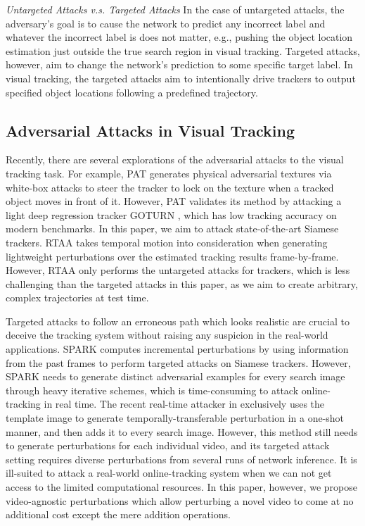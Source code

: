 \documentclass[journal]{IEEEtran}
\newcommand{\eg}{e.g.}
\begin{document}
\textit{Untargeted Attacks v.s. Targeted Attacks} In the case of untargeted attacks, the adversary's goal is to cause the network to predict any incorrect label and whatever the incorrect label is does not matter, \eg, pushing the object location estimation just outside the true search region in visual tracking.
Targeted attacks, however, aim to change the network's prediction to some specific target label. In visual tracking, the targeted attacks aim to intentionally drive trackers to output specified object locations following a predefined trajectory.

\subsection{Adversarial Attacks in Visual Tracking}

Recently, there are several explorations of the adversarial attacks to the visual tracking task. For example, PAT \cite{PAT} generates physical adversarial textures via white-box attacks to steer the tracker to lock on the texture when a tracked object moves in front of it. However, PAT validates its method by attacking a light deep regression tracker GOTURN \cite{GOTURN}, which has low tracking accuracy on modern benchmarks. In this paper, we aim to attack state-of-the-art Siamese trackers.
RTAA \cite{RTAA} takes temporal motion into consideration when generating lightweight perturbations over the estimated tracking results frame-by-frame. However, RTAA only performs the untargeted attacks for trackers, which is less challenging than the targeted attacks in this paper, as we aim to create arbitrary, complex trajectories at test time. 

Targeted attacks to follow an erroneous path which looks realistic are crucial to deceive the tracking system without raising any suspicion in the real-world applications.
SPARK \cite{SPARK} computes incremental perturbations by using information from the past frames to perform targeted attacks on Siamese trackers. 
However, SPARK needs to generate distinct adversarial examples for every search image through heavy iterative schemes, which is time-consuming to attack online-tracking in real time. The recent real-time attacker in \cite{TTP} exclusively uses the template image to generate temporally-transferable perturbation in a one-shot manner, and then adds it to every search image. However, this method still needs to generate perturbations for each individual video, and its targeted attack setting requires diverse perturbations from several runs of network inference. It is ill-suited to attack a real-world online-tracking system when we can not get access to the limited computational resources. In this paper, however, we propose video-agnostic perturbations which allow perturbing a novel video to come at no additional cost except the mere addition operations.
\end{document}
